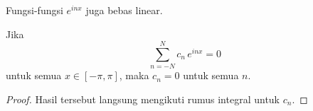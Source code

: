 Fungsi-fungsi $e^{inx}$ juga bebas linear.

\begin{prop}
Jika
\begin{equation*}
\sum_{n=-N}^N c_n \, e^{inx} = 0
\end{equation*}
untuk semua $x \in [-\pi,\pi]$, maka $c_n = 0$ untuk semua $n$.
\end{prop}

\begin{proof}
Hasil tersebut langsung mengikuti rumus integral untuk $c_n$.
\end{proof}

